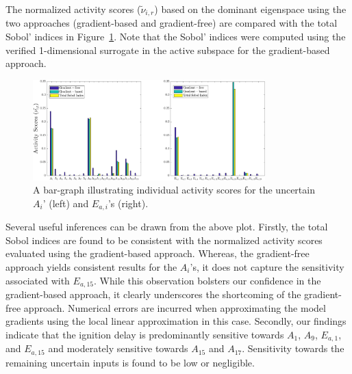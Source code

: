 The normalized activity scores ($\tilde{\nu}_{i,r}$) based on the dominant eigenspace using the two
approaches (gradient-based and gradient-free) are compared with the total Sobol' indices
in Figure~\ref{fig:as_33D}. Note that the Sobol' indices were computed using the verified
1-dimensional surrogate in the active subspace for the gradient-based approach. 
%
\begin{figure}[htbp]
 \begin{center}
  \includegraphics[width=0.8\textwidth]{./Figures/as_33D_new}
\caption{A bar-graph illustrating individual activity scores for the uncertain $A_i$' (left) and $E_{a,i}$'s (right).}
\label{fig:as_33D}
\end{center}
\end{figure}
%
Several useful inferences can be drawn from the above plot. Firstly, the total Sobol indices are found to be
consistent
with the normalized activity scores evaluated using the gradient-based approach. Whereas, the gradient-free
approach yields consistent results for the $A_i$'s, it does not capture the sensitivity associated with
$E_{a,15}$. While this observation bolsters our confidence in the gradient-based approach, it clearly
underscores the shortcoming of the gradient-free approach. Numerical errors are incurred when approximating
the model gradients using the local linear approximation in this case. 
Secondly, our findings indicate that   
the ignition delay is predominantly sensitive towards $A_1$, $A_9$, $E_{a,1}$, and $E_{a,15}$ and 
moderately sensitive towards $A_{15}$ and $A_{17}$. Sensitivity towards the remaining uncertain inputs is
found to be low or negligible. 
































